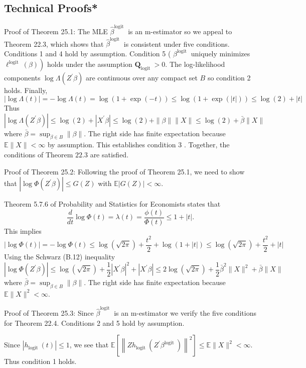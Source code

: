 \documentclass[10pt]{article}
\begin{document}
\subsection{Technical Proofs*}
Proof of Theorem 25.1: The MLE $\widehat{\beta}^{\text {logit }}$ is an m-estimator so we appeal to Theorem 22.3, which shows that $\widehat{\beta}^{\text {logit }}$ is consistent under five conditions. Conditions 1 and 4 hold by assumption. Condition 5 ( $\beta^{\text {logit }}$ uniquely minimizes $\left.\ell^{\text {logit }}(\beta)\right)$ holds under the assumption $\boldsymbol{Q}_{\text {logit }}>0$. The log-likelihood components $\log \Lambda\left(Z^{\prime} \beta\right)$ are continuous over any compact set $B$ so condition 2 holds. Finally,
$$
|\log \Lambda(t)|=-\log \Lambda(t)=\log (1+\exp (-t)) \leq \log (1+\exp (|t|)) \leq \log (2)+|t|
$$
Thus
$$
\left|\log \Lambda\left(Z^{\prime} \beta\right)\right| \leq \log (2)+\left|X^{\prime} \beta\right| \leq \log (2)+\|\beta\|\|X\| \leq \log (2)+\bar{\beta}\|X\|
$$
where $\bar{\beta}=\sup _{\beta \in B}\|\beta\|$. The right side has finite expectation because $\mathbb{E}\|X\|<\infty$ by assumption. This establishes condition 3 . Together, the conditions of Theorem $22.3$ are satisfied.

Proof of Theorem 25.2: Following the proof of Theorem 25.1, we need to show that $\left|\log \Phi\left(Z^{\prime} \beta\right)\right| \leq G(Z)$ with $\mathbb{E}|G(Z)|<\infty$.

Theorem 5.7.6 of Probability and Statistics for Economists states that
$$
\frac{d}{d t} \log \Phi(t)=\lambda(t)=\frac{\phi(t)}{\Phi(t)} \leq 1+|t| .
$$
This implies
$$
|\log \Phi(t)|=-\log \Phi(t) \leq \log (\sqrt{2 \pi})+\frac{t^{2}}{2}+\log (1+|t|) \leq \log (\sqrt{2 \pi})+\frac{t^{2}}{2}+|t|
$$
Using the Schwarz (B.12) inequality
$$
\left|\log \Phi\left(Z^{\prime} \beta\right)\right| \leq \log (\sqrt{2 \pi})+\frac{1}{2}\left|X^{\prime} \beta\right|^{2}+\left|X^{\prime} \beta\right| \leq 2 \log (\sqrt{2 \pi})+\frac{1}{2} \bar{\beta}^{2}\|X\|^{2}+\bar{\beta}\|X\|
$$
where $\bar{\beta}=\sup _{\beta \in B}\|\beta\|$. The right side has finite expectation because $\mathbb{E}\|X\|^{2}<\infty$.

Proof of Theorem 25.3: Since $\widehat{\beta}^{\text {logit }}$ is an m-estimator we verify the five conditions for Theorem 22.4. Conditions 2 and 5 hold by assumption.

Since $\left|h_{\text {logit }}(t)\right| \leq 1$, we see that $\mathbb{E}\left[\left\|Z h_{\text {logit }}\left(Z^{\prime} \beta^{\text {logit }}\right)\right\|^{2}\right] \leq \mathbb{E}\|X\|^{2}<\infty$. Thus condition 1 holds.
\end{document}

